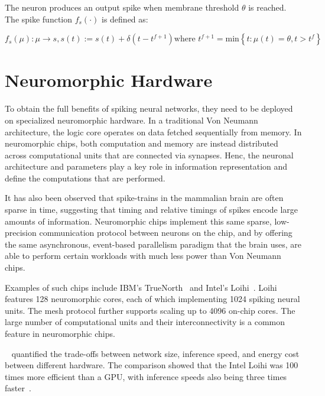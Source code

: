 \documentclass[fyp]{socreport}
\begin{document}
The neuron produces an output spike when membrane threshold $\theta$ is
reached. The spike function $f_{s}(\cdot)$ is defined as:

\begin{equation}
  \label{eq:slayer_spike_fn}
  f_{s}(\mu) : \mu \rightarrow s, s(t) := s(t) + \delta(t - t^{f+1}) \text{
    where } t^{f+1} = \textrm{min}\left\{t: \mu(t) = \theta, t > t^{f}\right\}
\end{equation}

\section{Neuromorphic Hardware\label{neuromorphic}}

To obtain the full benefits of spiking neural networks, they need to be deployed
on specialized neuromorphic hardware. In a traditional Von Neumann architecture,
the logic core operates on data fetched sequentially from memory. In
neuromorphic chips, both computation and memory are instead distributed across
computational units that are connected via synapses. Henc, the neuronal
architecture and parameters play a key role in information representation and
define the computations that are performed.

It has also been observed that spike-trains in the mammalian brain are often
sparse in time, suggesting that timing and relative timings of spikes encode
large amounts of information. Neuromorphic chips implement this same sparse,
low-precision communication protocol between neurons on the chip, and by
offering the same asynchronous, event-based parallelism paradigm that the brain
uses, are able to perform certain workloads with much less power than Von
Neumann chips.

Examples of such chips include IBM's TrueNorth~\cite{Merolla668} and Intel's
Loihi~\cite{davies2018loihi}. Loihi features 128 neuromorphic cores, each of
which implementing 1024 spiking neural units. The mesh protocol further supports
scaling up to 4096 on-chip cores. The large number of computational units and
their interconnectivity is a common feature in neuromorphic chips.

~\citeauthor{blouw18_bench_keywor_spott_effic_neurom_hardw} quantified the
trade-offs between network size, inference speed, and energy cost between
different hardware. The comparison showed that the Intel Loihi was 100 times
more efficient than a GPU, with inference speeds also being three times
faster~\cite{blouw18_bench_keywor_spott_effic_neurom_hardw}.
\end{document}

